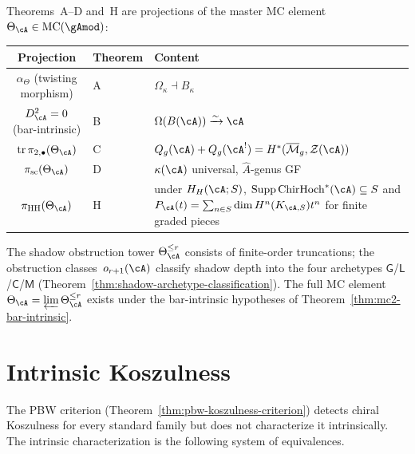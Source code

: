 \begin{proposition}
\label{prop:five-theorems-mc-projections}
\label{prop:top-down-architecture}
\ClaimStatusConditional
{}
Theorems~A--D and~H are projections of the master MC element $\Theta_\cA \in \mathrm{MC}(\gAmod)$:
\begin{center}
\begin{tabular}{cll}
\toprule
Projection & Theorem & Content \\
\midrule
$\alpha_{\Theta}$ (twisting morphism) & A & $\Omega_\kappa \dashv B_\kappa$ \\
$D_\cA^2 = 0$ (bar-intrinsic) & B & $\Omega(B(\cA)) \xrightarrow{\sim} \cA$ \\
$\mathrm{tr}\,\pi_{2,\bullet}(\Theta_\cA)$ & C & $Q_g(\cA) + Q_g(\cA^!) = H^*(\overline{\mathcal{M}}_g, \mathcal{Z}(\cA))$ \\
$\pi_{\mathrm{sc}}(\Theta_\cA)$ & D & $\kappa(\cA)$ universal, $\hat{A}$-genus GF \\
$\pi_{\mathrm{HH}}(\Theta_\cA)$ & H & under $H_H(\cA;S)$, $\operatorname{Supp}\mathrm{ChirHoch}^*(\cA)\subseteq S$ and $P_\cA(t)=\sum_{n\in S}\dim H^n(K_{\cA,S})t^n$ for finite graded pieces \\
\bottomrule
\end{tabular}
\end{center}
The shadow obstruction tower
$\Theta_\cA^{\leq r}$ consists of finite-order truncations; the
obstruction classes~$o_{r+1}(\cA)$ classify shadow depth into the
four archetypes
$\mathsf{G}$/$\mathsf{L}$/$\mathsf{C}$/$\mathsf{M}$
(Theorem~\ref{thm:shadow-archetype-classification}).
The full MC element
$\Theta_\cA = \varprojlim \Theta_\cA^{\leq r}$ exists under the
bar-intrinsic hypotheses of Theorem~\ref{thm:mc2-bar-intrinsic}.
\end{proposition}


\section{Intrinsic Koszulness}
\label{sec:concordance-koszulness-programme}

The PBW criterion (Theorem~\ref{thm:pbw-koszulness-criterion})
detects chiral Koszulness for every standard family but does
not characterize it intrinsically. The intrinsic characterization is
the following system of equivalences.

